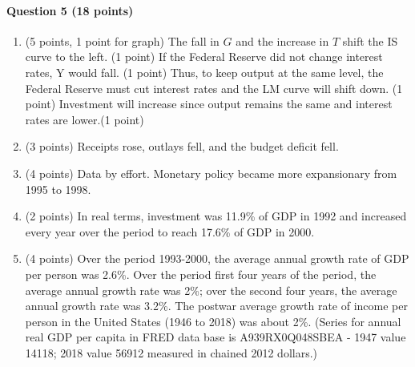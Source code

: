 \documentclass[12pt]{article}
\begin{document}
\paragraph{Question 5 (18 points)}
\begin{enumerate}[label=\alph*.]
    \item (5 points, 1 point for graph) The fall in $G$ and the increase in $T$ shift the IS curve to the left. (1 point) If the Federal Reserve did not change interest rates, Y would fall. (1 point) Thus, to keep output at the same level, the Federal Reserve must cut interest rates and the LM curve will shift down. (1 point) Investment will increase since output remains the same and interest rates are lower.(1 point)
    \item (3 points) Receipts rose, outlays fell, and the budget deficit fell.
    \item (4 points) Data by effort. Monetary policy became more expansionary from 1995 to 1998.
    \item (2 points) In real terms, investment was 11.9\% of GDP in 1992 and increased every year over the period to reach 17.6\% of GDP in 2000.
    \item (4 points) Over the period 1993-2000, the average annual growth rate of GDP per person was 2.6\%. Over the period first four years of the period, the average annual growth rate was 2\%; over the second four years, the average annual growth rate was 3.2\%. The postwar average growth rate of income per person in the United States (1946 to 2018) was about 2\%. (Series for annual real GDP per capita in FRED data base is A939RX0Q048SBEA - 1947 value 14118; 2018 value 56912 measured in chained 2012 dollars.)
\end{enumerate}
\end{document}
